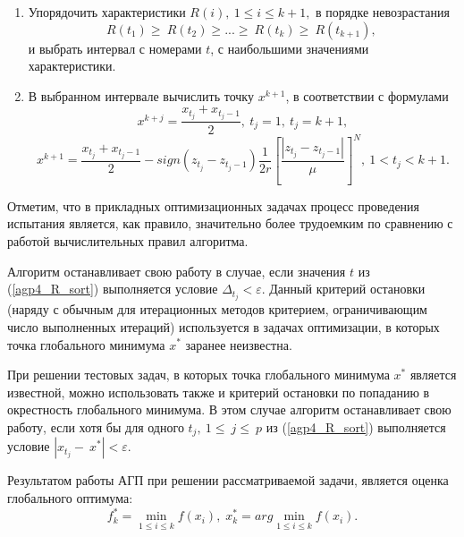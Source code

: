 \documentclass[12pt, a4paper, russian]{article}
\begin{document}
\begin{enumerate}
	\item   Упорядочить характеристики $R\left(i\right),\ 1\leq i \leq k+1,$ в порядке невозрастания 
	\begin{equation}
		\label{agp4_R_sort}
	R\left(t_1\right)\geq\ R\left(t_2\right)\geq...\geq\ R\left(t_k\right)\geq\ R(t_{k+1}),\ 
	\end{equation}	
	и выбрать интервал с номерами $t$, с наибольшими значениями характеристики.

	\item  В выбранном интервале вычислить точку $x^{k+1}$, в соответствии с формулами
	\begin{equation}
		\label{agp5_x1}
	x^{k+j}=\frac{x_{t_j}+x_{t_j-1}}{2},\ t_j=1,\ t_j=k+1,
	\end{equation}	
	\begin{equation}
		\label{agp4_xi}	
	x^{k+1}=\frac{x_{t_j}+x_{t_j-1}}{2}-sign\left(z_{t_j}-z_{t_j-1}\right)\frac{1}{2r}\left[\frac{\left|z_{t_j}-z_{t_j-1}\right|}{\mu}\right]^N,\ 1<t_j<k+1.
	\end{equation}	

\end{enumerate}

Отметим, что в прикладных оптимизационных задачах процесс проведения испытания является, как правило, значительно более трудоемким по сравнению с работой вычислительных правил алгоритма.

Алгоритм останавливает свою работу в случае, если значения $t$ из (\ref{agp4_R_sort}) выполняется условие \(\Delta_{t_j} < \varepsilon\). Данный критерий остановки (наряду с обычным для итерационных методов критерием, ограничивающим число выполненных итераций) используется в задачах оптимизации, в которых точка глобального минимума $x^*$ заранее неизвестна. 
	 
При решении тестовых задач, в которых точка глобального минимума $x^*$ является  известной, можно использовать также и критерий остановки по попаданию в окрестность глобального минимума. В этом случае алгоритм останавливает свою работу, если хотя бы для одного $t_j,\ 1\le\ j\le\ p$ из (\ref{agp4_R_sort}) выполняется условие $\left|x_{t_j}-\ x^\ast\right| < \varepsilon.$
	
Результатом работы АГП при решении рассматриваемой задачи, является оценка глобального оптимума:
\begin{equation}
	f_k^*=\min_{1\leq i \leq k}f(x_i), \; x_k^*=arg \min_{1\leq i \leq k}f(x_i).
\end{equation}
\end{document}
